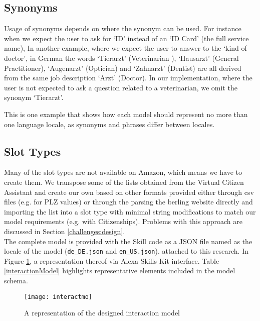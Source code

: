 \subsection*{Synonyms}
Usage of synonyms depends on where the synonym can be used. For instance when we expect the user to ask for `ID' instead of an `ID Card' (the full service name), In another example, where we expect the user to answer to the `kind of doctor', in German the words `Tierarzt' (Veterinarian ), `Hausarzt' (General Practitioner), `Augenarzt' (Optician) and `Zahnarzt' (Dentist) are all derived from the same job description `Arzt' (Doctor). In our implementation, where the user is not expected to ask a question related to a veterinarian, we omit the synonym `Tierarzt'.

This is one example that shows how each model should represent no more than one language locale, as synonyms and phrases differ between locales.


\subsection*{Slot Types}
Many of the slot types are not available on Amazon, which means we have to create them. We transpose some of the lists obtained from the Virtual Citizen Assistant and create our own based on other formats provided either through csv files (e.g. for PLZ values) or through the parsing the berling website directly and importing the list into a slot type with minimal string modifications to match our model requirements (e.g. with Citizenships). Problems with this approach are discussed in Section \ref{challenges:design}. \\





The complete model is provided with the Skill code as a JSON file named as the locale of the model (\texttt{de_DE.json} and \texttt{en_US.json}). attached to this research. In Figure \ref{interactionModel:bild}, a representation thereof via Alexa Skills Kit interface. Table \ref{interactionModel} highlights representative elements included in the model schema.

\begin{figure}[h!]
	\centering
	\caption[Interaction Model]{A representation of the designed interaction model}
	\label{interactionModel:bild}
		\texttt{[image: interactmo]}
		
		  
\end{figure}

